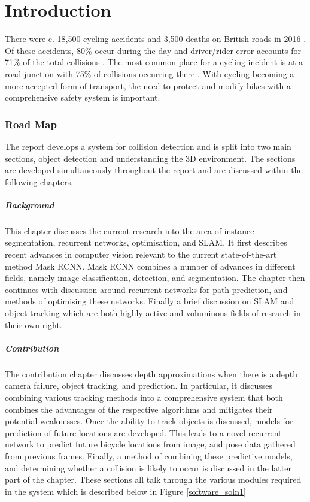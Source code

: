 \documentclass[11pt,twoside]{report}
\begin{document}
\chapter{Introduction}

There were c. 18,500 cycling accidents and 3,500 deaths on British roads in 2016 \cite{DFT_fig}. Of these accidents, 80\% occur during the day and driver/rider error accounts for 71\% of the total collisions \cite{DFT_fig2}. The most common place for a cycling incident is at a road junction with 75\% of collisions occurring there \cite{DFT_fig3}. With cycling becoming a more accepted form of transport, the need to protect and modify bikes with a comprehensive safety system is important.

\subsection{Road Map} The report develops a system for collision detection and is split into two main sections, object detection and understanding the 3D environment. The sections are developed simultaneously throughout the report and are discussed within the following chapters.

\paragraph{Background} This chapter discusses the current research into the area of instance segmentation, recurrent networks, optimisation, and SLAM. It first describes recent advances in computer vision relevant to the current state-of-the-art method Mask RCNN. Mask RCNN combines a number of advances in different fields, namely image classification, detection, and segmentation. The chapter then continues with discussion around recurrent networks for path prediction, and methods of optimising these networks. Finally a brief discussion on SLAM and object tracking which are both highly active and voluminous fields of research in their own right.

\paragraph{Contribution}
The contribution chapter discusses depth approximations when there is a depth camera failure, object tracking, and prediction. In particular, it discusses combining various tracking methods into a comprehensive system that both combines the advantages of the respective algorithms and mitigates their potential weaknesses. Once the ability to track objects is discussed, models for prediction of future locations are developed. This leads to a novel recurrent network to predict future bicycle locations from image, and pose data gathered from previous frames. Finally, a method of combining these predictive models, and determining whether a collision is likely to occur is discussed in the latter part of the chapter. These sections all talk through the various modules required in the system which is described below in Figure \ref{software_soln1}
\end{document}
